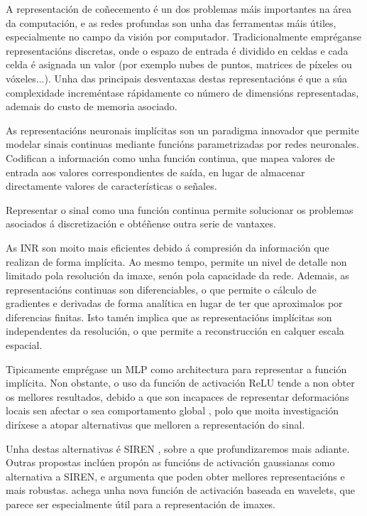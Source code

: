 A representación de coñecemento é un dos problemas máis importantes na área da computación, e as 
redes profundas son unha das ferramentas máis útiles, especialmente no campo da visión por computador.
Tradicionalmente empréganse representacións discretas, onde o espazo de entrada é dividido en celdas e cada celda é asignada un valor (por exemplo nubes de puntos, matrices de píxeles ou vóxeles...).
Unha das principais desventaxas destas representacións é que a súa complexidade increméntase rápidamente co número de dimensións representadas, ademais do custo de memoria asociado.

 As representacións neuronais implícitas son un paradigma innovador que permite modelar sinais continuas mediante funcións parametrizadas por redes neuronales.
 Codifican a información como unha función continua, que mapea valores de entrada aos valores correspondientes de saída, en lugar de almacenar directamente valores de características o señales.

Representar o sinal como una función continua permite solucionar os problemas asociados á discretización e obtéñense outra serie de vantaxes.

As INR son moito mais eficientes debido á compresión da información que realizan de forma implícita. Ao mesmo tempo, permite un nivel de detalle non limitado pola resolución da imaxe, senón pola capacidade da rede. 
 Ademais, as representacións continuas son diferenciables, o que permite o cálculo de gradientes e derivadas de forma analítica en lugar de ter que aproximalos por diferencias finitas.
 Isto tamén implica que as representacións implícitas son independentes da resolución, o que permite a reconstrucción en calquer escala espacial.
 
Tipicamente emprégase un MLP como architectura para representar a función implícita. Non obstante, o uso da función de activación ReLU tende a non obter os mellores resultados, debido a que son incapaces de representar deformacións locais sen afectar o sea comportamento global \cite{rahaman2019spectralbiasneuralnetworks},
polo que moita investigación diríxese a atopar alternativas que melloren a representación do sinal. \cite{essakine2024standimplicitneuralrepresentations}

Unha destas alternativas é SIREN \cite{sitzmann2020implicitneuralrepresentationsperiodic}, sobre a que profundizaremos mais adiante.
Outras propostas inclúen \cite{ramasinghe2022periodicityunifyingframeworkactivations} propón as funcións de activación gaussianas como alternativa a SIREN, e argumenta que poden obter mellores representacións e mais robustas.
\cite{saragadam2023wirewaveletimplicitneural} achega unha nova función de activación baseada en wavelets, que parece ser especialmente útil para a representación de imaxes.

